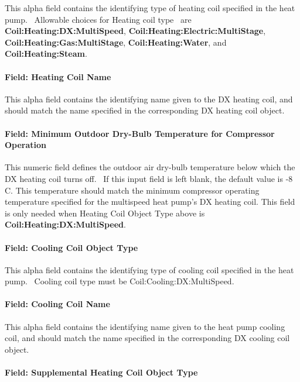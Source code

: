 This alpha field contains the identifying type of heating coil specified in the heat pump.~ Allowable choices for Heating coil type~ are \textbf{Coil:Heating:DX:MultiSpeed}, \textbf{Coil:Heating:Electric:MultiStage}, \textbf{Coil:Heating:Gas:MultiStage}, \textbf{Coil:Heating:Water}, and~ \textbf{Coil:Heating:Steam}.

\paragraph{Field: Heating Coil Name}\label{field-heating-coil-name-4}

This alpha field contains the identifying name given to the DX heating coil, and should match the name specified in the corresponding DX heating coil object.

\paragraph{Field: Minimum Outdoor Dry-Bulb Temperature for Compressor Operation}\label{field-minimum-outdoor-dry-bulb-temperature-for-compressor-operation-000}

This numeric field defines the outdoor air dry-bulb temperature below which the DX heating coil turns off.~ If this input field is left blank, the default value is -8 C. This temperature should match the minimum compressor operating temperature specified for the multispeed heat pump's DX heating coil. This field is only needed when Heating Coil Object Type above is \textbf{Coil:Heating:DX:MultiSpeed}.

\paragraph{Field: Cooling Coil Object Type}\label{field-cooling-coil-object-type-4}

This alpha field contains the identifying type of cooling coil specified in the heat pump.~ Cooling coil type must be Coil:Cooling:DX:MultiSpeed.

\paragraph{Field: Cooling Coil Name}\label{field-cooling-coil-name-4}

This alpha field contains the identifying name given to the heat pump cooling coil, and should match the name specified in the corresponding DX cooling coil object.

\paragraph{Field: Supplemental Heating Coil Object Type}\label{field-supplemental-heating-coil-object-type-2}

